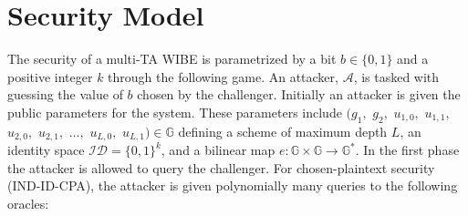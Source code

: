 \documentclass[10pt]{llncs}
\newcommand{\A}{\mathcal{A}}
\newcommand{\Gbb}{\mathbb{G}}
\newcommand{\ID}{\mathit{ID}}
\newcommand{\TA}{\mathit{TA}}
\newcommand{\adv}[2]{\mathit{Adv}_{#1}^{\texttt{#2}}}
\begin{document}
\begin{comment}
\begin{eqnarray*}
	& \adv{\A}{IND}(k) = |Pr[b'=1|b=1]-Pr[b'=1|b=0]|
\end{eqnarray*}

The disallowed oracle queries:
\begin{enumerate}
	\item A \texttt{Corrupt} query for any $\vec{\ID}$ in the test coalition matching pattern $\mathit{P}$
	\item A \texttt{Corrupt} query for any $\vec{\ID}$ in the test coalition that is an ancestor of pattern $\mathit{P}$, i.e. there exists $\vec{\ID}^*$ such that $\vec{\ID}\|\vec{\ID}^*$ matches the pattern $\mathit{P}$ %
	\item A \texttt{UserDecrypt} decrypt query for $C^{*}$ and any user $\ID$ in the test coalition matching the pattern $\mathit{P}$ %
\end{enumerate}
\end{comment}

\section{Security Model}

The security of a multi-TA WIBE is parametrized by a bit $b \in \{0,1\}$ and a positive integer $k$ through the following game. An attacker, $\A$, is tasked with guessing the value of $b$ chosen by the challenger. Initially an attacker is given the public parameters for the system. These parameters include $(g_1,$ $g_2,$ $u_{1,0},$ $u_{1,1},$ $u_{2,0},$ $u_{2,1},$ $\ldots,$ $u_{L,0},$ $u_{L,1}) \in \Gbb$ defining a scheme of maximum depth $L$, an identity space $\mathcal{ID} = \{0,1\}^k$, and a bilinear map $e: \Gbb \times \Gbb \rightarrow \Gbb^*$. In the first phase the attacker is allowed to query the challenger. For chosen-plaintext security (IND-ID-CPA), the attacker is given polynomially many queries to the following oracles:
\end{document}
